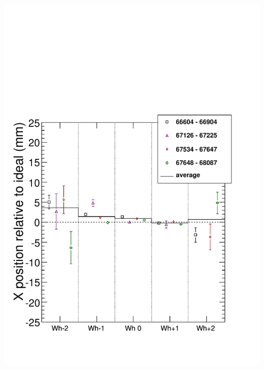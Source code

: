 \documentclass[compress]{beamer}
\begin{document}
\begin{frame}
{\begin{columns}
\includegraphics[width=\linewidth]{bydataset_HIPSC_x.pdf}

\end{columns}}
\end{frame}
\end{document}
